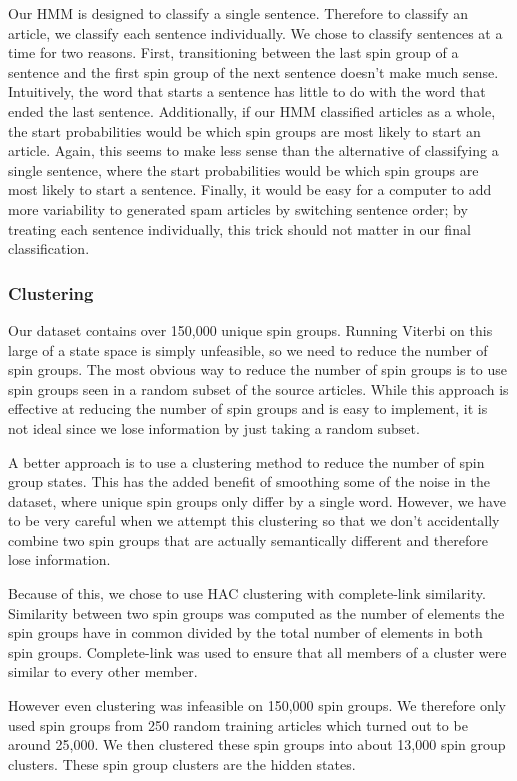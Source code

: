 \documentclass[11pt,letterpaper,oneside, titlepage]{scrartcl}
\begin{document}
Our HMM is designed to classify a single sentence. Therefore to classify an article, we classify each sentence individually. We chose to classify sentences at a time for two reasons. First, transitioning between the last spin group of a sentence and the first spin group of the next sentence doesn’t make much sense. Intuitively, the word that starts a sentence has little to do with the word that ended the last sentence. Additionally, if our HMM classified articles as a whole, the start probabilities would be which spin groups are most likely to start an article. Again, this seems to make less sense than the alternative of classifying a single sentence, where the start probabilities would be which spin groups are most likely to start a sentence. Finally, it would be easy for a computer to add more variability to generated spam articles by switching sentence order; by treating each sentence individually, this trick should not matter in our final classification.

\subsubsection{Clustering}

Our dataset contains over 150,000 unique spin groups. Running Viterbi on this large of a state space is simply unfeasible, so we need to reduce the number of spin groups. The most obvious way to reduce the number of spin groups is to use spin groups seen in a random subset of the source articles. While this approach is effective at reducing the number of spin groups and is easy to implement, it is not ideal since we lose information by just taking a random subset.

A better approach is to use a clustering method to reduce the number of spin group states. This has the added benefit of smoothing some of the noise in the dataset, where unique spin groups only differ by a single word. However, we have to be very careful when we attempt this clustering so that we don’t accidentally combine two spin groups that are actually semantically different and therefore lose information.

Because of this, we chose to use HAC clustering with complete-link similarity. Similarity between two spin groups was computed as the number of elements the spin groups have in common divided by the total number of elements in both spin groups. Complete-link was used to ensure that all members of a cluster were similar to every other member.

However even clustering was infeasible on 150,000 spin groups. We therefore only used spin groups from 250 random training articles which turned out to be around 25,000. We then clustered these spin groups into about 13,000 spin group clusters. These spin group clusters are the hidden states.
\end{document}
